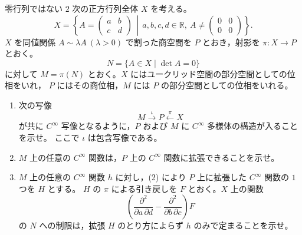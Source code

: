 \newcommand{\C}{\mathbb{C}}
\newcommand{\R}{\mathbb{R}}
\newcommand{\Z}{\mathbb{Z}}
\newcommand{\Tr}{\operatorname{Tr}}
\newcommand{\Impart}{\operatorname{Im}}
\newcommand{\AF}{\operatorname{AF}}
\newcommand{\AX}{\operatorname{AX}}
\newcommand{\GL}{\operatorname{GL}}


零行列ではない \(2\) 次の正方行列全体 \(X\) を考える。
\[
  X=\left\{
    A=\begin{pmatrix}a&b\\ c&d\end{pmatrix}
    \,\middle|\,
    a,b,c,d\in\R,\ 
    A\ne \begin{pmatrix}0&0\\0&0\end{pmatrix}
  \right\}.
\]
\(X\) を同値関係 \(A\sim \lambda A\ (\lambda>0)\) で割った商空間を \(P\) とおき，射影を
\(\pi:X\to P\) とおく。
\[
  N=\{A\in X\mid \det A=0\}
\]
に対して \(M=\pi(N)\) とおく。\(X\) にはユークリッド空間の部分空間としての位相をいれ，
\(P\) にはその商位相，\(M\) には \(P\) の部分空間としての位相をいれる。

\begin{enumerate}
  \item 次の写像
  \[
    M\xrightarrow{\iota}P\xleftarrow{\pi}X
  \]
  が共に \(C^\infty\) 写像となるように，\(P\) および \(M\) に \(C^\infty\) 多様体の構造が入ることを示せ。
  ここで \(\iota\) は包含写像である。
  \item \(M\) 上の任意の \(C^\infty\) 関数は，\(P\) 上の \(C^\infty\) 関数に拡張できることを示せ。
  \item \(M\) 上の任意の \(C^\infty\) 関数 \(h\) に対し，(2) により \(P\) 上に拡張した \(C^\infty\) 関数の \(1\) つを \(H\) とする。
  \(H\) の \(\pi\) による引き戻しを \(F\) とおく。\(X\) 上の関数
  \[
    \left(\frac{\partial^2}{\partial a\,\partial d}
      -\frac{\partial^2}{\partial b\,\partial c}\right)F
  \]
  の \(N\) への制限は，拡張 \(H\) のとり方によらず \(h\) のみで定まることを示せ。
\end{enumerate}

%